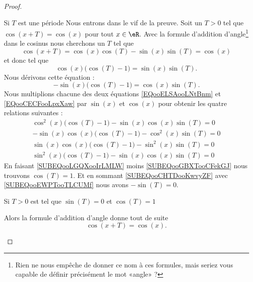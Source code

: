 \begin{proof}
\begin{subproof}
\item[Si \( T\) est une période]
    Nous entrons dans le vif de la preuve. Soit un \( T>0\) tel que \( \cos(x+T)=\cos(x)\) pour tout \( x\in \eR\). Avec la formule d'addition d'angle\footnote{Rien ne nous empêche de donner ce nom à ces formules, mais seriez vous capable de définir précisément le mot «angle» ?} dans le cosinus nous cherchons un \( T\) tel que
    \begin{equation}
        \cos(x+T)=\cos(x)\cos(T)-\sin(x)\sin(T)=\cos(x)
    \end{equation}
    et donc tel que
    \begin{equation}        \label{EQooELSAooLNtBnm}
        \cos(x)\big( \cos(T)-1 \big)=\sin(x)\sin(T).
    \end{equation}
    Nous dérivons cette équation :
    \begin{equation}        \label{EQooCECFooLpxXaw}
        -\sin(x)\big( \cos(T)-1 \big)=\cos(x)\sin(T).
    \end{equation}
    Nous multiplions chacune des deux équations \eqref{EQooELSAooLNtBnm} et \eqref{EQooCECFooLpxXaw} par \( \sin(x)\) et \( \cos(x)\) pour obtenir les quatre relations suivantes :
    \begin{subequations}
        \begin{align}
            \cos^2(x)\big( \cos(T)-1 \big)-\sin(x)\cos(x)\sin(T)=0   \label{SUBEQooLGQXooIrLMLW}\\
            -\sin(x)\cos(x)\big( \cos(T)-1 \big)-\cos^2(x)\sin(T)=0     \label{SUBEQooCHTDooKwvyZF}\\
            \sin(x)\cos(x)\big( \cos(T)-1 \big)-\sin^2(x)\sin(T)=0 \label{SUBEQooEWPTooTLCUMf}\\
            \sin^2(x)\big( \cos(T)-1 \big)-\sin(x)\cos(x)\sin(T)=0  \label{SUBEQooGBXTooCFekGJ}
        \end{align}
    \end{subequations}
    En faisant \eqref{SUBEQooLGQXooIrLMLW} moins \eqref{SUBEQooGBXTooCFekGJ} nous trouvons \( \cos(T)=1\). Et en sommant \eqref{SUBEQooCHTDooKwvyZF} avec \eqref{SUBEQooEWPTooTLCUMf} nous avons \( -\sin(T)=0\).

\item[Si \( T>0\) est tel que \( \sin(T)=0\) et \( \cos(T)=1\)]

    Alors la formule d'addition d'angle donne tout de suite
    \begin{equation}
        \cos(x+T)=\cos(x).
    \end{equation}


\end{subproof}
\end{proof}
